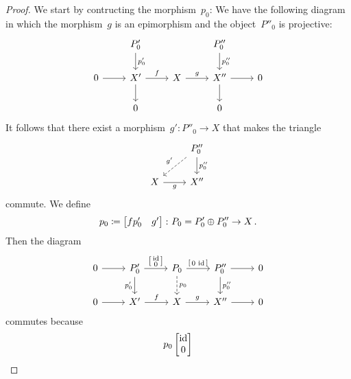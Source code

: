 \begin{proof}
  We start by contructing the morphism~$p_0$:
  We have the following diagram in which the morphism~$g$ is an epimorphism and the object~$P''_0$ is projective:
  \[
    \begin{tikzcd}
        {}
      & P'_0
        \arrow{d}[right]{p'_0}
      & {}
      & P''_0
        \arrow{d}[right]{p''_0}
      & {}
      \\
        0
        \arrow{r}
      & X'
        \arrow{r}[above]{f}
        \arrow{d}
      & X
        \arrow{r}[above]{g}
      & X'' 
        \arrow{r}
        \arrow{d}
      & 0
      \\
        {}
      & 0
      & {}
      & 0
      & {}
    \end{tikzcd}
  \]
  It follows that there exist a morphism~$g' \colon P''_0 \to X$ that makes the triangle
  \[
    \begin{tikzcd}
        {}
      & P''_0
        \arrow{d}[right]{p''_0}
        \arrow[dashed]{dl}[above left]{g'}
      \\
        X
        \arrow{r}[below]{g}
      & X''
    \end{tikzcd}
  \]
  commute.
  We define
  \[
    p_0
    \coloneqq
    \begin{bmatrix}
      f p'_0  & g'
    \end{bmatrix}
    \colon
    P_0
    =
    P'_0 \oplus P''_0
    \to
    X \,.
  \]
  Then the diagram
  \[
    \begin{tikzcd}[ampersand replacement = \&]
          0
          \arrow{r}
      \&  P'_0
          \arrow{r}[above]{\begin{bsmallmatrix} \id \\ 0 \end{bsmallmatrix}}
          \arrow{d}[left]{p'_0}
      \&  P_0
          \arrow{r}[above]{\begin{bsmallmatrix} 0 & \id \end{bsmallmatrix}}
          \arrow[dashed]{d}[right]{p_0}
      \&  P''_0
          \arrow{r}
          \arrow{d}[right]{p''_0}
      \&  0
      \\
          0
          \arrow{r}
      \&  X'
          \arrow{r}[above]{f}
      \&  X
          \arrow{r}[above]{g}
      \&  X''
          \arrow{r}
      \&  0
    \end{tikzcd}
  \]
  commutes because
  \begin{gather*}
      p_0
      \begin{bmatrix}
        \id \\
        0
      \end{bmatrix}

\end{gather*}
\end{proof}
